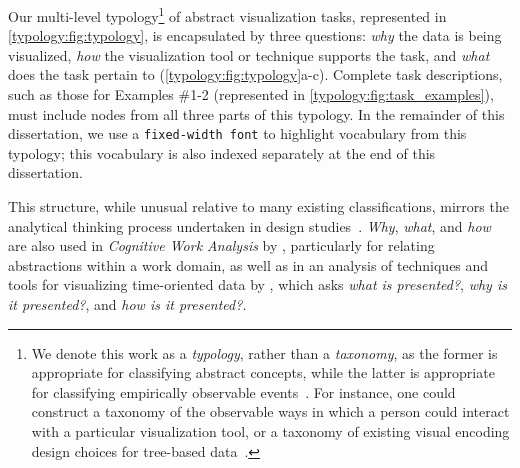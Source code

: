 

Our multi-level typology\footnote{We denote this work as a {\it typology}, rather than a {\it taxonomy}, as the former is appropriate for classifying abstract concepts, while the latter is appropriate for classifying empirically observable events~\cite{Bailey1994}. For instance, one could construct a taxonomy of the observable ways in which a person could interact with a particular visualization tool, or a taxonomy of existing visual encoding design choices for tree-based data~\cite{Schulz2011}.} of abstract visualization tasks, represented in \autoref{typology:fig:typology}, is encapsulated by three questions: {\it why} the data is being visualized, {\it how} the visualization tool or technique supports the task, and {\it what} does the task pertain to (\autoref{typology:fig:typology}a-c).
Complete task descriptions, such as those for Examples \#1-2 (represented in \autoref{typology:fig:task_examples}), must include nodes from all three parts of this typology.
In the remainder of this dissertation, we use a {\tt fixed-width font} to highlight vocabulary from this typology; this vocabulary is also indexed separately at the end of this dissertation.

This structure, while unusual relative to many existing classifications, mirrors the analytical thinking process undertaken in design studies~\cite{Sedlmair2012}.
{\it Why}, {\it what}, and {\it how} are also used in {\it Cognitive Work Analysis} by \citet{Vicente1999}, particularly for relating abstractions within a work domain, as well as in an analysis of techniques and tools for visualizing time-oriented data by \citet{Aigner2011}, which asks {\it what is presented?}, {\it why is it presented?}, and {\it how is it presented?}.

